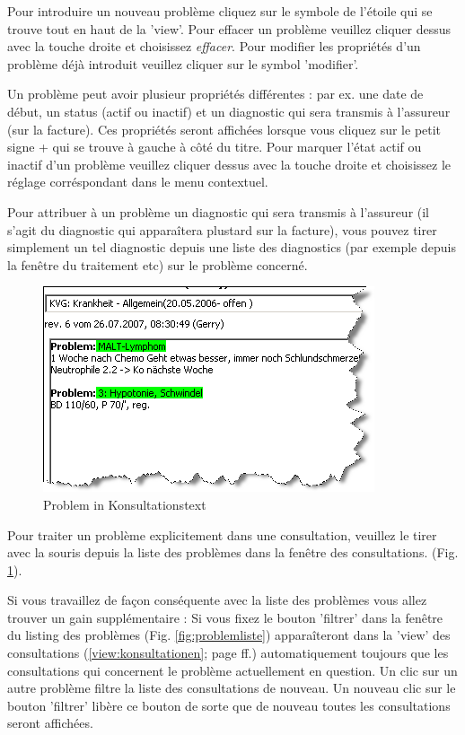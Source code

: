 Pour introduire un nouveau problème cliquez sur le symbole de l'étoile qui se trouve tout en haut de la 'view'. Pour effacer un problème veuillez cliquer dessus avec la touche droite et choisissez \textit{effacer}. Pour modifier les propriétés d'un problème déjà introduit veuillez cliquer sur le symbol 'modifier'.

Un problème peut avoir plusieur propriétés différentes : par ex. une date de début, un status (actif ou inactif) et un diagnostic qui sera transmis à l'assureur (sur la facture). Ces propriétés seront affichées lorsque vous cliquez sur le petit signe + qui se trouve à gauche à côté du titre. Pour marquer l'état actif ou inactif d'un problème veuillez cliquer dessus avec la touche droite et choisissez le réglage corréspondant dans le menu contextuel.

Pour attribuer à un problème un diagnostic qui sera transmis à l'assureur  (il s'agit du diagnostic qui apparaîtera plustard sur la facture), vous pouvez tirer simplement un tel diagnostic depuis une liste des diagnostics (par exemple depuis la fenêtre du traitement etc) sur le problème concerné.

\begin{figure}[ht]
    \includegraphics{images/problemliste2}
    \caption{Problem in Konsultationstext}
    \label{fig:problemliste2}
\end{figure}
Pour traiter un problème explicitement dans une consultation, veuillez le tirer avec la souris depuis la liste des problèmes dans la fenêtre des consultations. (Fig. \ref{fig:problemliste2}).

Si vous travaillez de façon conséquente avec la liste des problèmes vous allez trouver un gain supplémentaire : Si vous fixez le bouton 'filtrer' dans la fenêtre du listing des problèmes (Fig. \ref{fig:problemliste}) apparaîteront dans la 'view' des consultations (\ref{view:konsultationen}; page \pageref{view:konsultationen} ff.) automatiquement toujours que les consultations qui concernent le problème actuellement en question.
\label{filter:problemliste}
 Un clic sur un autre problème filtre la liste des consultations de nouveau. Un nouveau clic sur le bouton 'filtrer' libère ce bouton de sorte que de nouveau toutes les consultations seront affichées.

